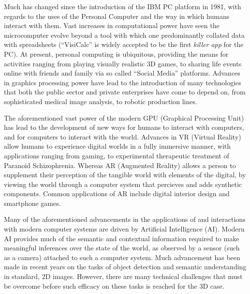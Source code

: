 Much has changed since the introduction of the IBM PC platform in 1981, with regards to the 
uses of the Personal Computer and the way in which humans interact with them. Vast increases 
in computational power have seen the microcomputer evolve beyond a tool with which one predominantly 
collated data with spreadsheets (``VisiCalc'' is widely accepted to be the first \textit{killer app}
for the PC). At present, personal computing is ubiquitous, providing the means for activities ranging 
from playing visually realistic 3D games, to sharing life events online with friends and family via 
so called ``Social Media'' platforms. Advances in graphics processing power have lead to the introduction 
of many technologies that both the public sector and private enterprises have come to depend on, from 
sophisticated medical image analysis, to robotic production lines.

The aforementioned vast power of the modern GPU (Graphical Processing Unit) has lead to the development 
of new ways for humans to interact with computers, and for computers to interact with the world. Advances 
in VR (Virtual Reality) allow humans to experience digital worlds in a fully immersive manner, with 
applications ranging from gaming, to experimental therapeutic treatment of Paranoid Schizophrenia. 
Whereas AR (Augmented Reality) allows a person to supplement their perception of the tangible world with 
elements of the digital, by viewing the world through a computer system that percieves and adds synthetic 
components. Common applications of AR include digital interior design and smartphone games.

Many of the aforementioned advancements in the applications of and interactions with modern computer 
systems are driven by Artificial Intelligence (AI). Modern AI provides much of the semantic and contextual 
information required to make meaningful inferences over the state of the world, as observed by a sensor 
(such as a camera) attached to such a computer system. Much advancement has been made in recent years on 
the tasks of object detection and semantic understanding in standard, 2D images. However, there are many 
technical challenges that must be overcome before such efficacy on these tasks is reached for the 3D 
case.




